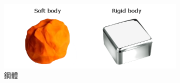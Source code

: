 \begin{figure}[h]
    \begin{subfigure}[b]{0.19\linewidth}
    \includegraphics[width=\linewidth]{./resources/physics/rigidBody.png}
    \caption{鋼體}
    \end{subfigure}
    \begin{subfigure}[b]{0.19\linewidth}

\end{subfigure}
\end{figure}
